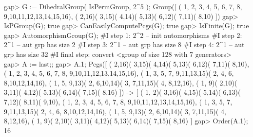 \beginexample 
gap> G := DihedralGroup( IsPermGroup, 2^5 );
Group([ ( 1, 2, 3, 4, 5, 6, 7, 8, 9,10,11,12,13,14,15,16), 
  ( 2,16)( 3,15)( 4,14)( 5,13)( 6,12)( 7,11)( 8,10) ])
gap> IsPGroup(G);
true
gap> CanEasilyComputePcgs(G);
true
gap> IsFinite(G);
true
gap> AutomorphismGroup(G);
#I  step 1: 2^2 -- init automorphisms 
#I  step 2: 2^1 -- aut grp has size 2
#I  step 3: 2^1 -- aut grp has size 8
#I  step 4: 2^1 -- aut grp has size 32
#I  final step: convert
<group of size 128 with 7 generators>
gap> A := last;;
gap> A.1;
Pcgs([ ( 2,16)( 3,15)( 4,14)( 5,13)( 6,12)( 7,11)( 8,10), 
  ( 1, 2, 3, 4, 5, 6, 7, 8, 9,10,11,12,13,14,15,16), 
  ( 1, 3, 5, 7, 9,11,13,15)( 2, 4, 6, 8,10,12,14,16), 
  ( 1, 5, 9,13)( 2, 6,10,14)( 3, 7,11,15)( 4, 8,12,16), 
  ( 1, 9)( 2,10)( 3,11)( 4,12)( 5,13)( 6,14)( 7,15)( 8,16) ]) -> 
[ ( 1, 2)( 3,16)( 4,15)( 5,14)( 6,13)( 7,12)( 8,11)( 9,10), 
  ( 1, 2, 3, 4, 5, 6, 7, 8, 9,10,11,12,13,14,15,16), 
  ( 1, 3, 5, 7, 9,11,13,15)( 2, 4, 6, 8,10,12,14,16), 
  ( 1, 5, 9,13)( 2, 6,10,14)( 3, 7,11,15)( 4, 8,12,16), 
  ( 1, 9)( 2,10)( 3,11)( 4,12)( 5,13)( 6,14)( 7,15)( 8,16) ]
gap> Order(A.1);
16
\endexample

